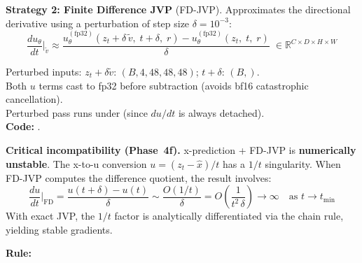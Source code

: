 \textbf{Strategy 2: Finite Difference JVP} (FD-JVP).  Approximates the
directional derivative using a perturbation of step size
$\delta = 10^{-3}$:
\begin{equation}
  \frac{du_\theta}{dt}\bigg|_{\tilde{v}}
    \approx \frac{
      u_\theta^{\mathrm{(fp32)}}(z_t + \delta\,\tilde{v},\;t + \delta,\;r)
      - u_\theta^{\mathrm{(fp32)}}(z_t,\;t,\;r)
    }{\delta}
    \;\in \mathbb{R}^{C \times D \times H \times W}
  \label{eq:fd_jvp}
\end{equation}
\begin{shapes}
Perturbed inputs: $z_t + \delta\tilde{v}$: $(B, 4, 48, 48, 48)$; $t + \delta$: $(B,)$.\\
Both $u$ terms cast to fp32 before subtraction (avoids bf16 catastrophic cancellation).\\
Perturbed pass runs under  (since $du/dt$ is always detached).\\
\textbf{Code:} .
\end{shapes}

\textbf{Critical incompatibility (Phase~4f).}  x-prediction + FD-JVP is
\textbf{numerically unstable}.  The x-to-u conversion
$u = (z_t - \hat{x})/t$ has a $1/t$ singularity.  When FD-JVP computes
the difference quotient, the result involves:
\begin{equation}
  \frac{du}{dt}\bigg|_\mathrm{FD}
    = \frac{u(t{+}\delta)-u(t)}{\delta}
    \sim \frac{O(1/t)}{\delta}
    = O\!\left(\frac{1}{t^2\,\delta}\right) \to \infty
  \quad\text{as }t\to t_{\min}
  \label{eq:fd_instability}
\end{equation}
With exact JVP, the $1/t$ factor is analytically differentiated via the
chain rule, yielding stable gradients.

\textbf{Rule:} \ \ %
\ \ %
